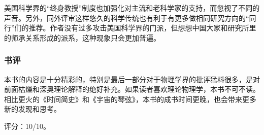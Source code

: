 美国科学界的“终身教授”制度也加强化对主流和老科学家的支持，而忽视了不同的声音。另外，同外评审这样悠久的科学传统也有利于有更多做相同研究方向的“同行”们的推荐。作者没有过多攻击美国科学界的门派，但想想中国大家和研究所里的师承关系形成的派系，这种现象只会更加普遍。

\subsubsection{书评}

本书的内容是十分精彩的，特别是最后一部分对于物理学界的批评猛料很多，是对前面枯燥和深奥理论解释的绝好补充。如果读者喜欢理论物理学，本书不可不读。相比更火的《时间简史》和《宇宙的琴弦》，本书的成书时间更晚，也会带来更多新的发现和思考。

评分：10/10。